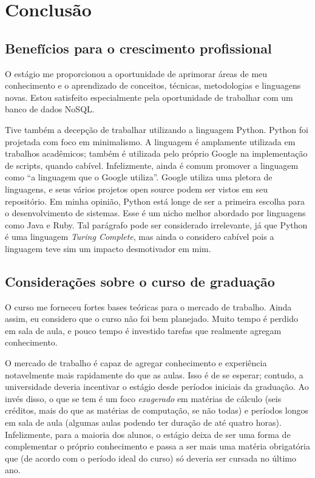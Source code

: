 \chapter{Conclusão}
\label{chap:conclusao}


\section{Benefícios para o crescimento profissional}

O estágio me proporcionou a oportunidade de aprimorar áreas de
meu conhecimento e o aprendizado de
conceitos, técnicas, metodologias e linguagens novas. Estou
satisfeito especialmente pela oportunidade de trabalhar com um
banco de dados NoSQL.

Tive também a decepção de trabalhar utilizando a linguagem Python.
Python foi projetada com foco em minimalismo. A
linguagem é amplamente utilizada em trabalhos acadêmicos;
também é utilizada pelo próprio Google na implementação de
scripts, quando cabível. Infelizmente, ainda é comum promover a
linguagem como ``a linguagem que o Google utiliza''. Google
utiliza uma pletora de linguagens, e seus vários projetos open
source podem ser vistos em seu repositório. Em minha opinião,
Python está longe de ser a primeira escolha para o
desenvolvimento de sistemas. Esse é um nicho melhor abordado por
linguagens como Java e Ruby. Tal parágrafo pode ser considerado
irrelevante, já que Python é uma linguagem \emph{Turing
Complete}, mas ainda o considero cabível pois a linguagem teve
sim um impacto desmotivador em mim.



\section{Considerações sobre o curso de graduação}

O curso me forneceu fortes bases teóricas para o mercado de
trabalho. Ainda assim, eu considero que o curso não foi bem
planejado. Muito tempo é perdido em sala de aula, e pouco tempo é
investido tarefas que realmente agregam conhecimento.

O mercado de trabalho é capaz de agregar conhecimento e
experiência notavelmente mais rapidamente do que as aulas. Isso é
de se esperar; contudo, a universidade deveria incentivar o
estágio desde períodos iniciais da graduação. Ao invés disso, o
que se tem é um foco \emph{exagerado} em matérias de cálculo
(seis créditos, mais do que as matérias de computação, se não
todas) e períodos longos em sala de aula (algumas aulas podendo
ter duração de até quatro horas). Infelizmente, para a maioria
dos alunos, o estágio deixa de ser uma forma de complementar o
próprio conhecimento e passa a ser mais uma matéria obrigatória
que (de acordo com o período ideal do curso) só deveria ser
cursada no último ano.

